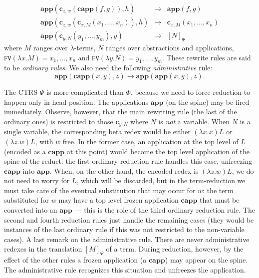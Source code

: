 \documentclass{LMCS}
\newcommand{\varone}{x}
\newcommand{\vartwo}{y}
\newcommand{\varthree}{z}
\newcommand{\varfour}{w}
\newcommand{\varfive}{f}
\newcommand{\varsix}{g}
\newcommand{\varseven}{h}
\newcommand{\lambdaone}{M}
\newcommand{\lambdatwo}{N}
\newcommand{\lambdathree}{L}
\newcommand{\appTRS}{\mathbf{app}}
\newcommand{\cappTRSW}{\mathbf{capp}}
\newcommand{\constr}[2]{\mathbf{c}_{#1,#2}}
\newcommand{\LambdatoTRSW}[1]{[#1]_{\Psi}}
\newcommand{\TRS}{\Phi}
\newcommand{\TRSW}{\Psi}
\newcommand{\rewrTRSW}{\rightarrow}
\newcommand{\FV}[1]{\mathtt{FV}(#1)}
\newenvironment{varitemize}
{
\begin{list}{\labelitemi}
{\setlength{\itemsep}{0.0mm}
 \setlength{\topsep}{0.0mm}
 \setlength{\parindent}{0.0mm}
 \setlength{\parskip}{0.0mm}
 \setlength{\parsep}{0.0mm}
 \setlength{\partopsep}{0.0mm}
 \setlength{\leftmargin}{15pt}
 \setlength{\labelsep}{5pt}
 \setlength{\labelwidth}{10pt}}}
{
 \end{list} 
}
\begin{document}
\begin{varitemize}
\begin{eqnarray*}
      \appTRS(\constr{\varthree}{\varfour}(\cappTRSW(\varfive,\varsix)),\varseven)&\rewrTRSW&\appTRS(\varfive,\varsix)\\
      \appTRS(\constr{\varthree}{\varfour}(\constr{\varone}{\lambdaone}(\varone_1,\ldots,\varone_n)),\varseven)&\rewrTRSW&
        \constr{\varone}{\lambdaone}(\varone_1,\ldots,\varone_n)\\
     \appTRS(\constr{\vartwo}{\lambdatwo}(\vartwo_1,\ldots,\vartwo_{m}),\vartwo)&\rewrTRSW&\LambdatoTRSW{\lambdatwo}
    \end{eqnarray*}
    where $\lambdaone$ ranges over $\lambda$-terms, $\lambdatwo$ ranges over abstractions and
    applications,
    $\FV{\lambda\varone.\lambdaone}=\varone_1,\ldots,\varone_n$
    and $\FV{\lambda\vartwo.\lambdatwo}=\vartwo_1,\ldots,\vartwo_m$. These rewrite rules
    are said to be \emph{ordinary rules}. We also need the following \emph{administrative} rule:
    $$
    \appTRS(\cappTRSW(\varone,\vartwo),\varthree)\rewrTRSW\appTRS(\appTRS(\varone,\vartwo),\varthree).
    $$
\end{varitemize}
The CTRS $\TRSW$ is more complicated than $\TRS$, because we need to force reduction to happen only in head position. The applications $\appTRS$ (on the spine) may be fired immediately.
Observe, however, that the main rewriting rule (the last of the ordinary ones) is restricted to those 
$\constr{\vartwo}{\lambdatwo}$
where $\lambdatwo$ is \emph{not} a variable. When $\lambdatwo$ is a single variable, 
the corresponding beta redex would be either $(\lambda x.x)\lambdathree$ or 
$(\lambda z.w)\lambdathree$, with $w$ free. In the former case, an application at the top
level of $\lambdathree$ (encoded as a $\cappTRSW$ at this point) would become the top level
application of the spine of the reduct: the first ordinary reduction rule handles this case, unfreezing
$\cappTRSW$ into  $\appTRS$. When, on the other hand, the encoded redex is 
$(\lambda z.w)\lambdathree$, we do not need to worry for $\lambdathree$, which will be discarded,
but in the term-reduction we must take care of the eventual substitution that may occur for
$w$: the term substituted for $w$ may have a top level frozen application $\cappTRSW$ that must be
converted into an $\appTRS$ --- this is the role of the third ordinary reduction rule. 
The second and fourth reduction rules just handle the remaining cases (they would be
instances of the last ordinary rule if this was not restricted to the non-variable cases).
A last remark on the administrative rule. There are never administrative redexes in the translation $\LambdatoTRSW{\lambdaone}$ of a term. During reduction, however, by the effect of the other rules a frozen application (a $\cappTRSW$)
    may appear on the spine. The administrative rule recognizes this situation and unfreezes the application.
\end{document}
